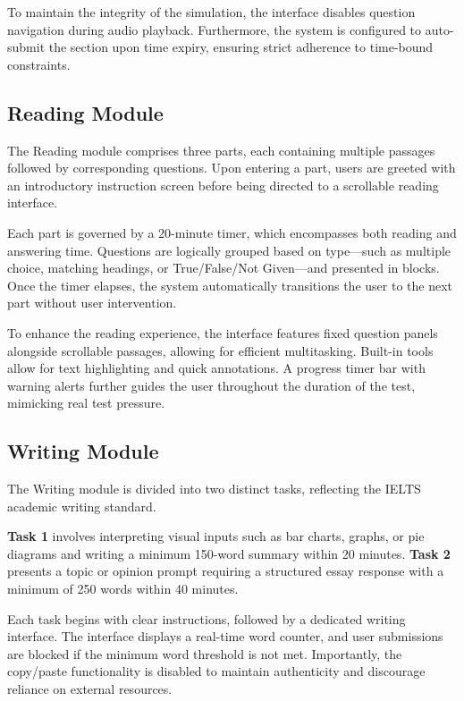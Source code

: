 \documentclass[a4paper,12pt]{article}
\begin{document}
To maintain the integrity of the simulation, the interface disables question navigation during audio playback. Furthermore, the system is configured to auto-submit the section upon time expiry, ensuring strict adherence to time-bound constraints.

\vspace{0.4cm}
\subsection{Reading Module}

The Reading module comprises three parts, each containing multiple passages followed by corresponding questions. Upon entering a part, users are greeted with an introductory instruction screen before being directed to a scrollable reading interface.

Each part is governed by a 20-minute timer, which encompasses both reading and answering time. Questions are logically grouped based on type—such as multiple choice, matching headings, or True/False/Not Given—and presented in blocks. Once the timer elapses, the system automatically transitions the user to the next part without user intervention.

To enhance the reading experience, the interface features fixed question panels alongside scrollable passages, allowing for efficient multitasking. Built-in tools allow for text highlighting and quick annotations. A progress timer bar with warning alerts further guides the user throughout the duration of the test, mimicking real test pressure.

\vspace{0.4cm}
\subsection{Writing Module}

The Writing module is divided into two distinct tasks, reflecting the IELTS academic writing standard. 

\textbf{Task 1} involves interpreting visual inputs such as bar charts, graphs, or pie diagrams and writing a minimum 150-word summary within 20 minutes. \textbf{Task 2} presents a topic or opinion prompt requiring a structured essay response with a minimum of 250 words within 40 minutes.

Each task begins with clear instructions, followed by a dedicated writing interface. The interface displays a real-time word counter, and user submissions are blocked if the minimum word threshold is not met. Importantly, the copy/paste functionality is disabled to maintain authenticity and discourage reliance on external resources.
\end{document}
